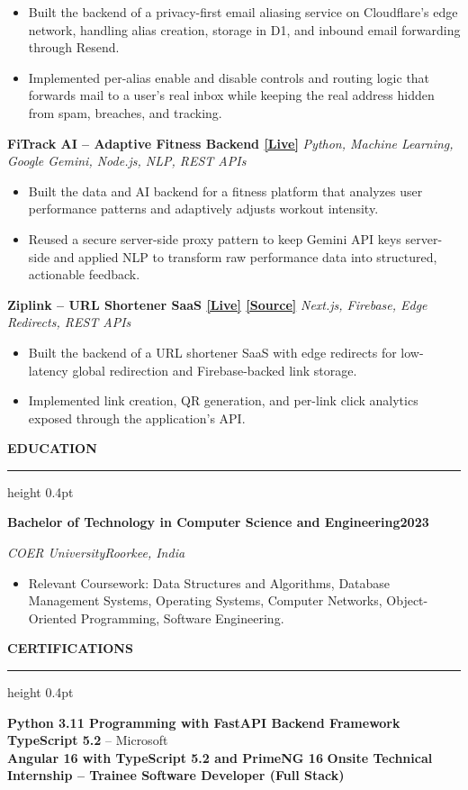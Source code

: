 \documentclass[10pt,a4paper]{article}
\newcommand{\resumeSection}[1]{%
  \vspace{5pt}
  {\normalsize\bfseries\color{heading} #1}\par
  \vspace{1pt}
  {\color{rulecolor}\hrule height 0.4pt}
  \vspace{3pt}
}
\newcommand{\resumeSubheading}[4]{%
  \textbf{#1}\hfill\textbf{#2}\par
  \textit{#3}\hfill\textit{#4}\par
  \vspace{-0.15em}
}
\newcommand{\projectHeading}[2]{%
  \textbf{#1} \textbar{} \textit{#2}\par
  \vspace{-0.15em}
}
\begin{document}
\begin{itemize}
  \item Built the backend of a privacy-first email aliasing service on
  Cloudflare's edge network, handling alias creation, storage in D1, and
  inbound email forwarding through Resend.

  \item Implemented per-alias enable and disable controls and routing logic
  that forwards mail to a user's real inbox while keeping the real address
  hidden from spam, breaches, and tracking.
\end{itemize}

\projectHeading
{FiTrack AI -- Adaptive Fitness Backend \href{https://fittrack.0xshiv.dev/}{[Live]}}
{Python, Machine Learning, Google Gemini, Node.js, NLP, REST APIs}

\begin{itemize}
  \item Built the data and AI backend for a fitness platform that analyzes
  user performance patterns and adaptively adjusts workout intensity.

  \item Reused a secure server-side proxy pattern to keep Gemini API keys
  server-side and applied NLP to transform raw performance data into
  structured, actionable feedback.
\end{itemize}

\projectHeading
{Ziplink -- URL Shortener SaaS \href{https://ziplink.0xshiv.dev}{[Live]} \href{https://github.com/Tech-aficionado/ZipLink---Open-Source}{[Source]}}
{Next.js, Firebase, Edge Redirects, REST APIs}

\begin{itemize}
  \item Built the backend of a URL shortener SaaS with edge redirects for
  low-latency global redirection and Firebase-backed link storage.

  \item Implemented link creation, QR generation, and per-link click
  analytics exposed through the application's API.
\end{itemize}

\resumeSection{EDUCATION}

\resumeSubheading
{Bachelor of Technology in Computer Science and Engineering}
{2023}
{COER University}
{Roorkee, India}

\begin{itemize}
  \item Relevant Coursework: Data Structures and Algorithms, Database
  Management Systems, Operating Systems, Computer Networks,
  Object-Oriented Programming, Software Engineering.
\end{itemize}

\resumeSection{CERTIFICATIONS}

{\small
\textbf{Python 3.11 Programming with FastAPI Backend Framework}
\quad \textbar{} \quad
\textbf{TypeScript 5.2} -- Microsoft
\\[2pt]
\textbf{Angular 16 with TypeScript 5.2 and PrimeNG 16}
\quad \textbar{} \quad
\textbf{Onsite Technical Internship -- Trainee Software Developer (Full Stack)}
}
\end{document}
